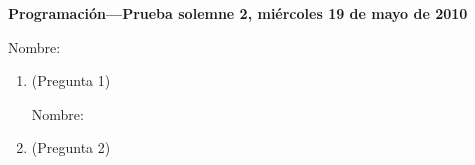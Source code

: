 \documentclass[11pt,spanish]{article}
\newcommand{\onelinerule}{\rule[2.3ex]{0pt}{0pt}}
\newcommand{\nombre}{\framebox[0.8\textwidth]{\onelinerule}}
\begin{document}
  \thispagestyle{empty}
  \pagestyle{empty}
  {\Large\bfseries Programación---Prueba solemne 2, miércoles 19 de mayo de 2010}

  Nombre: \nombre

  \begin{enumerate}
    \item (Pregunta 1)

      \newpage 
      Nombre: \nombre

    \item (Pregunta 2)

      \framebox[\textwidth]{\rule[39ex]{0pt}{0pt}}

  \end{enumerate}
\end{document}
